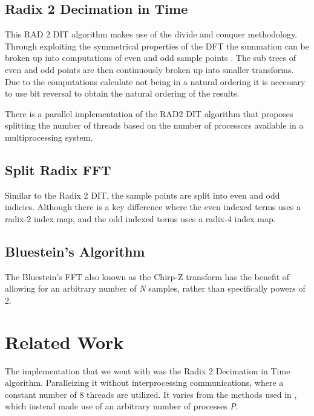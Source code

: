 \documentclass[journal]{IEEEtran}
\begin{document}
	\subsection{Radix 2 Decimation in Time}
		\par{
			This RAD 2 DIT algorithm makes use of the divide and conquer methodology. Through exploiting 
			the symmetrical properties of the DFT the summation can be broken up into computations of even 
			and odd sample points \cite{Soni}. The sub trees of even and odd points are then continuously 
			broken up into smaller transforms. Due to the computations calculate not being in a natural ordering 
			it is necessary to use bit reversal to obtain the natural ordering of the results.
		}
		\par{
			There is a parallel implementation of the RAD2 DIT algorithm that proposes splitting the number of threads 
			based on the number of processors available in a multiprocessing system.
		}
	\subsection{Split Radix FFT}
		\par{
			Similar to the Radix 2 DIT, the sample points are split into even and odd indicies. Although there is 
			a key difference where the even indexed terms uses a radix-2 index map, and the odd indexed terms uses 
			a radix-4 index map. 
		}
	\subsection{Bluestein's Algorithm}
		\par{
			The Bluestein's FFT also known as the Chirp-Z transform has the benefit of allowing for an arbitrary
			number of \textit{N} samples, rather than specifically powers of 2.
		}

\section{Related Work}
\par{
	The implementation that we went with was the Radix 2 Decimation in Time algorithm. Paralleizing it without 
	interprocessing communications, where a constant number of 8 threads are utilized. It varies from the 
	methods used in \cite{Xie}, which instead made use of an arbitrary number of processes \textit{P}. 
	
}
\end{document}
